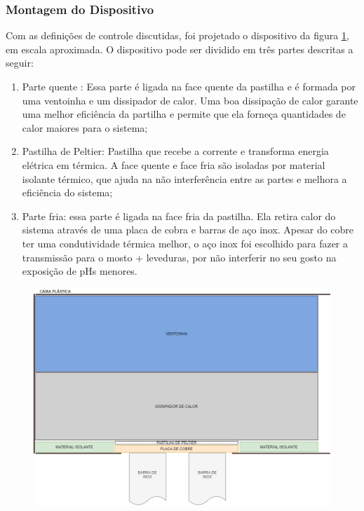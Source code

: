 \subsubsection{Montagem do Dispositivo}

Com as definições de controle discutidas, foi projetado o dispositivo da figura \ref{fig:dispositivo_term}, em escala aproximada. O dispositivo pode ser dividido em três partes descritas a seguir:

\begin{enumerate}
    \item Parte quente : Essa parte é ligada na face quente da pastilha e é formada por uma ventoinha e um dissipador de calor. Uma boa dissipação de calor garante uma melhor eficiência da partilha e permite que ela forneça quantidades de calor maiores para o sistema;
    \item Pastilha de Peltier: Pastilha que recebe a corrente e transforma energia elétrica em térmica. A face quente e face fria são isoladas por material isolante térmico, que ajuda na não interferência entre as partes e melhora a eficiência do sistema;
    \item Parte fria: essa parte é ligada na face fria da pastilha. Ela retira calor do sistema através de uma placa de cobra e barras de aço inox. Apesar do cobre ter uma condutividade térmica melhor, o aço inox foi escolhido para fazer a transmissão para o mosto + leveduras, por não interferir no seu gosto na exposição de pHs menores. 
\end{enumerate}


\begin{figure}[H]
    \centering
    \includegraphics[scale=0.45]{figuras/implementacao/hardware/montagem.png}
    \label{fig:dispositivo_term}
\end{figure}

